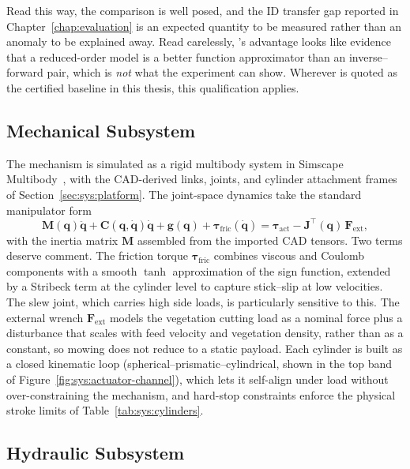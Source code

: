 Read this way, the comparison is well posed, and the ID transfer gap
reported in Chapter~\ref{chap:evaluation} is an expected quantity to be
measured rather than an anomaly to be explained away. Read carelessly,
\ppoROM's advantage looks like evidence that a reduced-order model is a
better function approximator than an inverse--forward pair, which is
\emph{not} what the experiment can show. Wherever \ppoROM{} is quoted as
the certified baseline in this thesis, this qualification applies.

\subsection{Mechanical Subsystem}

The mechanism is simulated as a rigid multibody system in Simscape
Multibody~\cite{mathworks2024simscape}, with the CAD-derived links,
joints, and cylinder attachment frames of
Section~\ref{sec:sys:platform}. The joint-space dynamics take the
standard manipulator form
%
\begin{equation}
  \label{eq:sys:eom}
  \bm{M}(\bm{q})\ddot{\bm{q}}
  + \bm{C}(\bm{q},\dot{\bm{q}})\dot{\bm{q}}
  + \bm{g}(\bm{q})
  + \bm{\tau}_{\mathrm{fric}}(\dot{\bm{q}})
  = \bm{\tau}_{\mathrm{act}} - \bm{J}^{\top}(\bm{q})\,\bm{F}_{\mathrm{ext}},
\end{equation}
%
with the inertia matrix $\bm{M}$ assembled from the imported CAD
tensors. Two terms deserve comment. The friction torque
$\bm{\tau}_{\mathrm{fric}}$ combines viscous and Coulomb components
with a smooth $\tanh$ approximation of the sign function, extended by a
Stribeck term at the cylinder level to capture stick--slip at low
velocities. The slew joint, which carries high side loads, is
particularly sensitive to this. The external wrench
$\bm{F}_{\mathrm{ext}}$ models the vegetation cutting load as a nominal
force plus a disturbance that scales with feed velocity and vegetation
density, rather than as a constant, so mowing does not reduce to a
static payload. Each cylinder is built as a closed kinematic loop
(spherical--prismatic--cylindrical, shown in the top band of
Figure~\ref{fig:sys:actuator-channel}), which lets it self-align under
load without over-constraining the mechanism, and hard-stop constraints
enforce the physical stroke limits of
Table~\ref{tab:sys:cylinders}.

\subsection{Hydraulic Subsystem}

